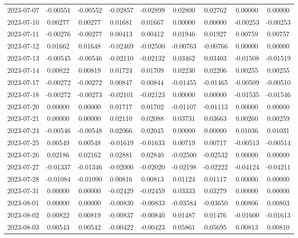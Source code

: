 \begin{footnotesize}
\begin{longtable}{lcccccccc}
2023-07-07 & -0.00551 & -0.00552 & -0.02857 & -0.02899 & 0.02800 & 0.02762 & 0.00000 & 0.00000 \\
2023-07-10 & 0.00277 & 0.00277 & 0.01681 & 0.01667 & 0.00000 & 0.00000 & -0.00253 & -0.00253 \\
2023-07-11 & -0.00276 & -0.00277 & 0.00413 & 0.00412 & 0.01946 & 0.01927 & 0.00759 & 0.00757 \\
2023-07-12 & 0.01662 & 0.01648 & -0.02469 & -0.02500 & -0.00763 & -0.00766 & 0.00000 & 0.00000 \\
2023-07-13 & -0.00545 & -0.00546 & -0.02110 & -0.02132 & 0.03462 & 0.03403 & -0.01508 & -0.01519 \\
2023-07-14 & 0.00822 & 0.00819 & 0.01724 & 0.01709 & 0.02230 & 0.02206 & 0.00255 & 0.00255 \\
2023-07-17 & -0.00272 & -0.00272 & 0.00847 & 0.00844 & -0.01455 & -0.01465 & -0.00509 & -0.00510 \\
2023-07-18 & -0.00272 & -0.00273 & -0.02101 & -0.02123 & 0.00000 & 0.00000 & -0.01535 & -0.01546 \\
2023-07-20 & 0.00000 & 0.00000 & 0.01717 & 0.01702 & -0.01107 & -0.01113 & 0.00000 & 0.00000 \\
2023-07-21 & 0.00000 & 0.00000 & 0.02110 & 0.02088 & 0.03731 & 0.03663 & 0.00260 & 0.00259 \\
2023-07-24 & -0.00546 & -0.00548 & 0.02066 & 0.02045 & 0.00000 & 0.00000 & 0.01036 & 0.01031 \\
2023-07-25 & 0.00549 & 0.00548 & -0.01619 & -0.01633 & 0.00719 & 0.00717 & -0.00513 & -0.00514 \\
2023-07-26 & 0.02186 & 0.02162 & 0.02881 & 0.02840 & -0.02500 & -0.02532 & 0.00000 & 0.00000 \\
2023-07-27 & -0.01337 & -0.01346 & -0.02000 & -0.02020 & -0.02198 & -0.02222 & -0.04124 & -0.04211 \\
2023-07-28 & -0.01084 & -0.01090 & 0.00816 & 0.00813 & 0.01124 & 0.01117 & 0.00000 & 0.00000 \\
2023-07-31 & 0.00000 & 0.00000 & -0.02429 & -0.02459 & 0.03333 & 0.03279 & 0.00000 & 0.00000 \\
2023-08-01 & 0.00000 & 0.00000 & -0.00830 & -0.00833 & -0.03584 & -0.03650 & 0.00806 & 0.00803 \\
2023-08-02 & 0.00822 & 0.00819 & -0.00837 & -0.00840 & 0.01487 & 0.01476 & -0.01600 & -0.01613 \\
2023-08-03 & 0.00543 & 0.00542 & -0.00422 & -0.00423 & 0.05861 & 0.05695 & 0.00813 & 0.00810 \\

\end{longtable}
\end{footnotesize}

